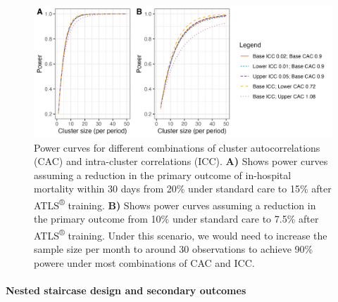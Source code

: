 \documentclass[
]{scrartcl}
\let\oldparagraph\paragraph
\renewcommand{\paragraph}[1]{\oldparagraph{#1}\mbox{}}
\begin{document}
\begin{figure}

{\centering \includegraphics[width=7.08in,height=\textheight]{./combined-power-curves.png}

}

\caption{\label{fig-power-curves}Power curves for different combinations
of cluster autocorrelations (CAC) and intra-cluster correlations (ICC).
\textbf{A)} Shows power curves assuming a reduction in the primary
outcome of in-hospital mortality within 30 days from 20\% under standard
care to 15\% after ATLS\textsuperscript{®} training. \textbf{B)} Shows
power curves assuming a reduction in the primary outcome from 10\% under
standard care to 7.5\% after ATLS\textsuperscript{®} training. Under
this scenario, we would need to increase the sample size per month to
around 30 observations to achieve 90\% powere under most combinations of
CAC and ICC.}

\end{figure}

\hypertarget{nested-staircase-design-and-secondary-outcomes}{%
\paragraph{Nested staircase design and secondary
outcomes}\label{nested-staircase-design-and-secondary-outcomes}}
\end{document}
